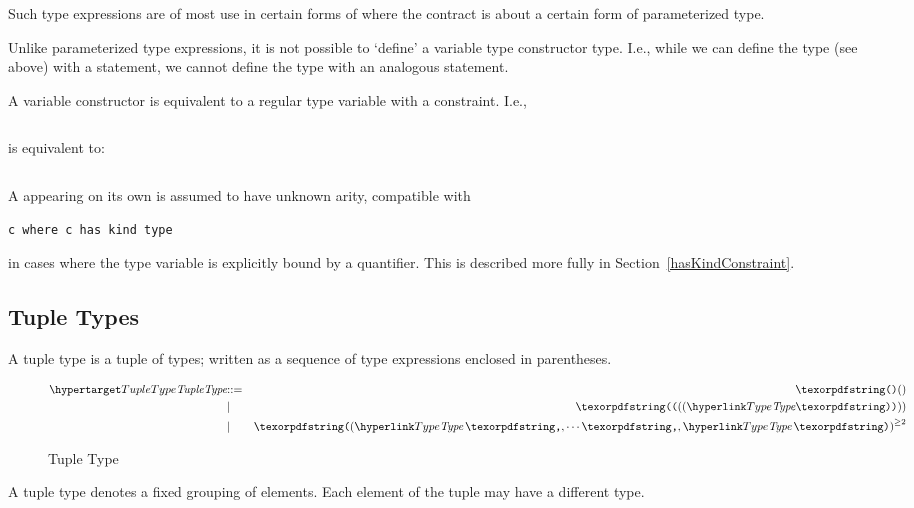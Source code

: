 Such type expressions are of most use in certain forms of  where the contract is about a certain form of parameterized type.

\begin{aside}
Unlike parameterized type expressions, it is not possible to `define' a variable type constructor type. I.e., while we can define the  type (see above) with a  statement, we cannot define the type  with an analogous statement.
\end{aside}

\begin{aside}
A variable constructor is equivalent to a regular type variable with a  constraint. I.e., 
\begin{lstlisting}[mathescape=true]
%c of (%t$\sub1\sequence{,}$%t$\subn$)
\end{lstlisting}
is equivalent to:
\begin{lstlisting}[mathescape=true]
%c of (%t$\sub1\sequence{,}$%t$\subn$) where %c has kind type of (type$\sequence{,}$type)
\end{lstlisting}
A  appearing on its own is assumed to have unknown arity, compatible with
\begin{lstlisting}
c where c has kind type
\end{lstlisting}
in cases where the type variable  is explicitly bound by a quantifier.
This is described more fully in Section~\vref{hasKindConstraint}.
\end{aside}

\subsection{Tuple Types}
\label{tupleType}
A tuple type is a tuple of types; written as a sequence of type expressions enclosed in parentheses.

\begin{figure}[htbp]
\begin{eqnarray*}
\ntDef{TupleType}&\arrow&\q{()}\\
&\choice&\q{((}\ntRef{Type}\q{))}\\
&\choice&\q{(}\ntRef{Type}\sequence{,}\ntRef{Type}\,\q{)}\plustwo
\end{eqnarray*}
\caption{Tuple Type}
\label{tupleTypeFig}
\end{figure}

A tuple type denotes a fixed grouping of elements. Each element of the tuple may have a different type.

